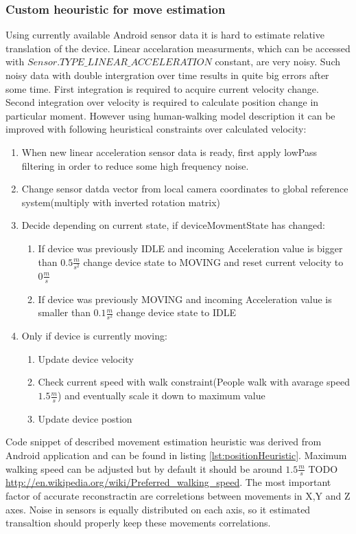 \subsubsection{Custom heouristic for move estimation}
Using currently available Android sensor data it is hard to estimate relative translation of the device. Linear accelaration measurments, which can be accessed with $Sensor.TYPE\_LINEAR\_ACCELERATION$ constant, are very noisy. Such noisy data with double intergration over time results in quite big errors after some time. First integration is required to acquire current velocity change. Second integration over velocity is required to calculate position change in particular moment.
However using human-walking model description it can be improved with following heuristical constraints over calculated velocity:
\begin{enumerate}
\item When new linear acceleration sensor data is ready, first apply lowPass filtering in order to reduce some high frequency noise.
\item Change sensor datda vector from local camera coordinates to global reference system(multiply with inverted rotation matrix)
\item Decide depending on current state, if deviceMovmentState has changed:
\begin{enumerate}
\item If device was previously IDLE and incoming Acceleration value is bigger than $0.5\frac{m}{s^2}$ change device state to MOVING and reset current velocity to $0\frac{m}{s}$
\item If device was previously MOVING and incoming Acceleration value is smaller than $0.1\frac{m}{s^2}$ change device state to IDLE
\end{enumerate}
\item Only if device is currently moving:
\begin{enumerate}
\item Update device velocity
\item Check current speed with walk constraint(People walk with avarage speed $1.5\frac{m}{s}$) and eventually scale it down to maximum value
\item Update device postion
\end{enumerate}
\end{enumerate}
Code snippet of described movement estimation heuristic was derived from Android application and can be found in listing \ref{lst:positionHeuristic}. Maximum walking speed can be adjusted but by default it should be around $1.5\frac{m}{s}$ TODO \url{http://en.wikipedia.org/wiki/Preferred_walking_speed}. 
The most important factor of accurate reconstractin are correletions between movements in X,Y and Z axes. Noise in sensors is equally distributed on each axis, so it estimated transaltion should properly keep these movements correlations.

